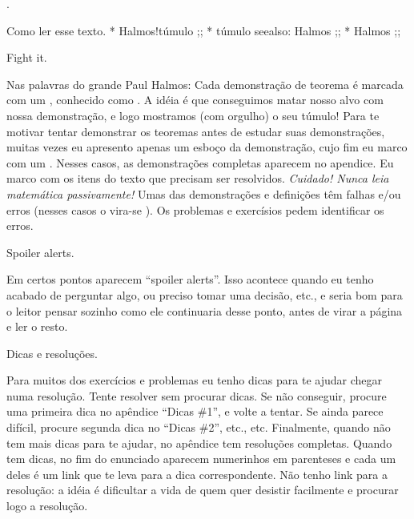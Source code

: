 
\chapblah \prefaceterm.

\secblah Como ler esse texto.
  * Halmos!túmulo
  ;;
\indexes
  * túmulo    seealso: Halmos
  ;;
\credits
  * Halmos
  ;;

\blah Fight it.

Nas palavras do grande Paul Halmos:
\spoken
{}
\endspoken
Cada demonstração de teorema é marcada com um \symq{$\qedsymbol$},
conhecido como .\foot
A idéia é que conseguimos matar nosso alvo com nossa demonstração,
e logo mostramos (com orgulho) o seu túmulo!
\toof
Para te motivar tentar demonstrar os teoremas antes de estudar suas demonstrações,
muitas vezes eu apresento apenas um esboço da demonstração,
cujo fim eu marco com um \symq{$\qessymbol$}.
Nesses casos, as demonstrações completas aparecem no apendice.
Eu marco com \symq{\activitysymbol} os itens do texto que
precisam ser resolvidos.
\endgraf
\emph{Cuidado! Nunca leia matemática passivamente!}
Umas das demonstrações e definições têm falhas e/ou erros
(nesses casos o \symq{$\qedsymbol$} vira-se \symq{$\mistakesymbol$}).
Os problemas e exercísios pedem identificar os erros.


\blah Spoiler alerts.

Em certos pontos aparecem ``spoiler alerts''.
Isso acontece quando eu tenho acabado de perguntar algo, ou preciso
tomar uma decisão, etc., e seria bom para o leitor pensar sozinho
como ele continuaria desse ponto, antes de virar a página
e ler o resto.


\blah Dicas e resoluções.

Para muitos dos exercícios e problemas eu tenho dicas para te ajudar
chegar numa resolução.  Tente resolver sem procurar dicas.
Se não conseguir, procure uma primeira dica no apêndice ``Dicas \#1'',
e volte a tentar.
Se ainda parece difícil, procure segunda dica no ``Dicas \#2'', etc., etc.
Finalmente, quando não tem mais dicas para te ajudar,
no apêndice tem resoluções completas.
Quando tem dicas, no fim do enunciado aparecem numerinhos em parenteses
e cada um deles é um link que te leva para a dica correspondente.
Não tenho link para a resolução: a idéia é dificultar a vida de quem
quer desistir facilmente e procurar logo a resolução.

